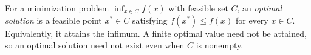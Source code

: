 
For a minimization problem $\inf_{x\in C}f(x)$ with feasible set $C$, an \emph{optimal solution} is a feasible point $x^*\in C$ satisfying $f(x^*)\le f(x)$ for every $x\in C$. Equivalently, it attains the infimum. A finite optimal value need not be attained, so an optimal solution need not exist even when $C$ is nonempty.
